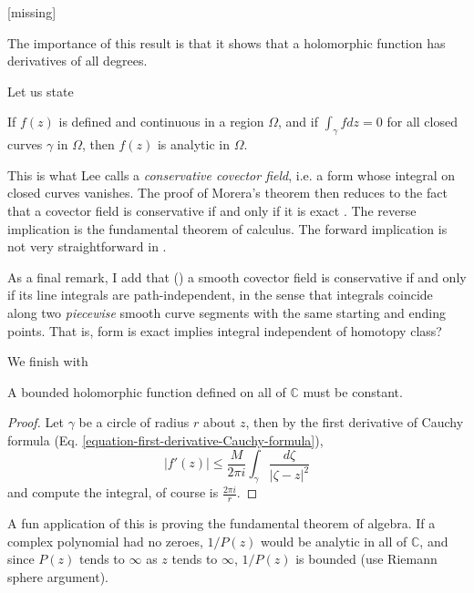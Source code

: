 \begin{lemma}
\label{lemma-technical-lemma}
[missing]
\end{lemma}

The importance of this result is that it shows that a holomorphic function has
derivatives of all degrees.

Let us state

\begin{theorem}[Morera]
\label{theorem-Morera}
\begin{reference}
\cite[p. 122]{ahl}
\end{reference}
If $f(z)$ is defined and continuous in a region $\Omega$, and if 
$\int_\gamma fdz=0$ for all closed curves $\gamma$ in $\Omega$, then $f(z)$ is
analytic in $\Omega$.
\end{theorem}

This is what Lee calls a {\it conservative covector field}, i.e. a form whose
integral on closed curves vanishes. The proof of Morera's theorem then reduces
to the fact that a covector field is conservative if and only if it is exact
\cite[Theorem 11.42]{les}. The reverse implication is the fundamental theorem of
calculus. The forward implication is not very straightforward in \cite{les}.

As a final remark, I add that (\cite[Propoistion 11.40]{les}) a smooth covector
field is conservative if and only if its line integrals are path-independent, in
the sense that integrals coincide along two {\it piecewise} smooth curve
segments with the same starting and ending points. That is, form is exact
implies integral independent of homotopy class?

We finish with

\begin{theorem}[Liouville]
\label{theorem-Liouville}
A bounded holomorphic function defined on all of $\mathbb{C}$ must be constant.
\end{theorem}

\begin{proof}
Let $\gamma$ be a circle of radius $r$ about $z$, then by the first derivative
of Cauchy formula (Eq. \ref{equation-first-derivative-Cauchy-formula}),
$$
|f'(z)|\leq \frac{M}{2\pi i}\int_\gamma \frac{d\zeta}{|\zeta-z|^2}
$$
and compute the integral, of course is $\frac{2\pi i}{r}$.
\end{proof}

A fun application of this is proving the fundamental theorem of algebra. If a
complex polynomial had no zeroes, $1/P(z)$ would be analytic in all of
$\mathbb{C}$, and since $P(z)$ tends to $\infty$ as $z$ tends to $\infty$,
$1/P(z)$ is bounded (use Riemann sphere argument).

